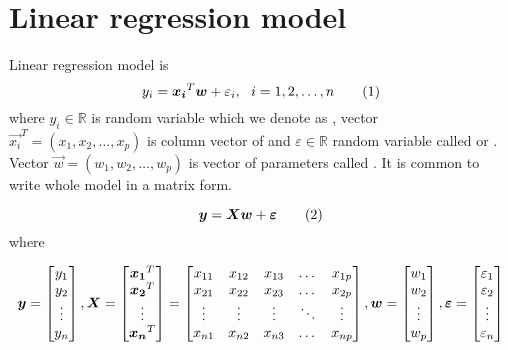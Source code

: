 \section{Linear regression model}
\begin{definition}\label{definition:lr_model}
    Linear regression model is 
    \[ 
        y_i = \vec{x_i}^T\vec{w} + \varepsilon_i\\, \ \  i = 1,2,\ldots,n \numberthis
    \]
where $y_i \in \mathbb{R}$ is random variable which we denote as , vector $\vec{x_i}^T = (x_1, x_2, \ldots, x_p)$ is column vector of  and $\varepsilon \in \mathbb{R}$ random variable called  or . Vector $\vec{w} = (w_1, w_2, \ldots, w_p)$ is vector of parameters called  . It is common to write whole model in a matrix form. 

\begin{equation}
    \vec{y} = \vec{X}\vec{w} + \vec{\varepsilon}    \numberthis
\end{equation} where

\[ 
\vec{y} = \begin{bmatrix}
    y_{1} \\
    y_{2} \\
    \vdots \\
    y_{n}
  \end{bmatrix}\\,
 \vec{X} = \begin{bmatrix}
    \vec{x_1}^T \\
    \vec{x_2}^T \\
    \vdots \\
    \vec{x_n}^T
\end{bmatrix}
=
\begin{bmatrix}
    x_{11} & x_{12} & x_{13} & \dots  & x_{1p} \\
    x_{21} & x_{22} & x_{23} & \dots  & x_{2p} \\
    \vdots & \vdots & \vdots & \ddots & \vdots \\
    x_{n1} & x_{n2} & x_{n3} & \dots  & x_{np}
\end{bmatrix}\\,
\vec{w} = \begin{bmatrix}
    w_{1} \\
    w_{2} \\
    \vdots \\
    w_{p}
  \end{bmatrix}\\,
  \vec{\varepsilon} = \begin{bmatrix}
    \varepsilon_{1} \\
    \varepsilon_{2} \\
    \vdots \\
    \varepsilon_{n}
  \end{bmatrix}
\]


\end{definition}
